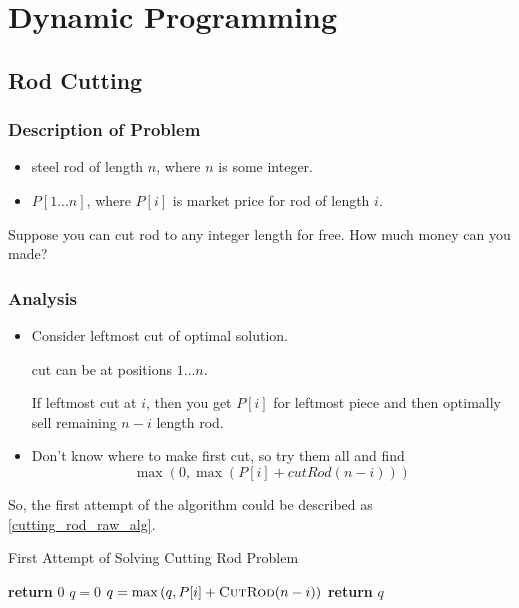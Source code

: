 \section{Dynamic Programming}

\subsection{Rod Cutting}

\subsubsection{Description of Problem}

\begin{itemize}
\item steel rod of length $n$, where $n$ is some integer.
\item $P[1...n]$, where $P[i]$ is market price for rod of length $i$.
\end{itemize}

\question

Suppose you can cut rod to any integer length for free.
How much money can you made?

\subsubsection{Analysis}

\begin{itemize}
\item Consider leftmost cut of optimal solution.

cut can be at positions $1...n$.

If leftmost cut at $i$, then you get $P[i]$ for leftmost piece and then optimally sell remaining $n-i$ length rod.

\item Don't know where to make first cut, so try them all and find
\[\max\left(0, \max(P[i] + cutRod(n-i))\right)\]
\end{itemize}

So, the first attempt of the algorithm could be described as \cref{cutting_rod_raw_alg}.

\begin{algorithm}[H]
\caption{First Attempt of Solving Cutting Rod Problem}\label{cutting_rod_raw_alg}
\begin{algorithmic}[1]
 
    \State \textbf{return} {$0$}
\EndIf
\State $q=0$
    \State $q = \max\left(q, P[i]+\textsc{CutRod} (n-i)\right)$
\EndFor
\State \textbf{return} {$q$}
\EndProcedure
\end{algorithmic}
\end{algorithm}

